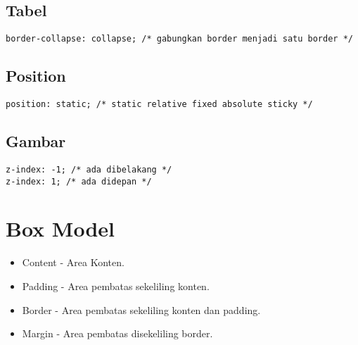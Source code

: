 \documentclass[12pt,a4paper]{article}
\begin{document}
\subsection*{Tabel}
\begin{lstlisting}
border-collapse: collapse; /* gabungkan border menjadi satu border */
\end{lstlisting}

\subsection*{Position}
\begin{lstlisting}
position: static; /* static relative fixed absolute sticky */
\end{lstlisting}

\subsection*{Gambar}
\begin{lstlisting}
z-index: -1; /* ada dibelakang */
z-index: 1; /* ada didepan */
\end{lstlisting}

\section*{Box Model}
\begin{itemize}
  \item Content - Area Konten.
  \item Padding - Area pembatas sekeliling konten.
  \item Border - Area pembatas sekeliling konten dan padding.
  \item Margin - Area pembatas disekeliling border.
\end{itemize}
\end{document}
